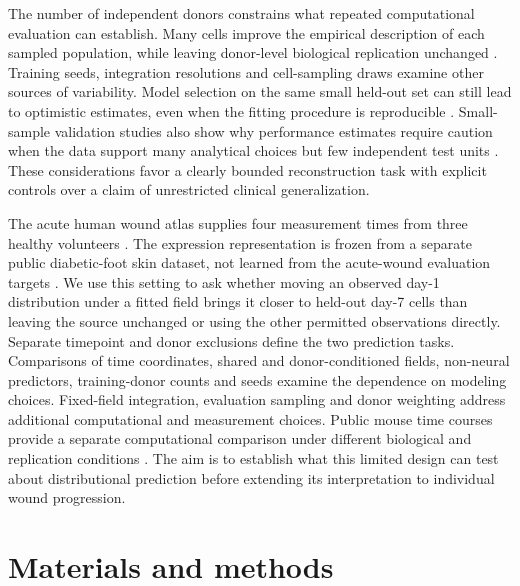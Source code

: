 \documentclass[10pt,a4paper]{article}
\begin{document}
The number of independent donors constrains what repeated computational evaluation can establish. Many cells improve the empirical description of each sampled population, while leaving donor-level biological replication unchanged \citep{zimmerman2021}. Training seeds, integration resolutions and cell-sampling draws examine other sources of variability. Model selection on the same small held-out set can still lead to optimistic estimates, even when the fitting procedure is reproducible \citep{varma2006,cawley2010}. Small-sample validation studies also show why performance estimates require caution when the data support many analytical choices but few independent test units \citep{vabalas2019}. These considerations favor a clearly bounded reconstruction task with explicit controls over a claim of unrestricted clinical generalization.

The acute human wound atlas supplies four measurement times from three healthy volunteers \citep{liu2025_wound,geo_gse241132}. The expression representation is frozen from a separate public diabetic-foot skin dataset, not learned from the acute-wound evaluation targets \citep{theocharidis2022}. We use this setting to ask whether moving an observed day-1 distribution under a fitted field brings it closer to held-out day-7 cells than leaving the source unchanged or using the other permitted observations directly. Separate timepoint and donor exclusions define the two prediction tasks. Comparisons of time coordinates, shared and donor-conditioned fields, non-neural predictors, training-donor counts and seeds examine the dependence on modeling choices. Fixed-field integration, evaluation sampling and donor weighting address additional computational and measurement choices. Public mouse time courses provide a separate computational comparison under different biological and replication conditions \citep{geo_gse326622}. The aim is to establish what this limited design can test about distributional prediction before extending its interpretation to individual wound progression.

\section{Materials and methods}
\end{document}
